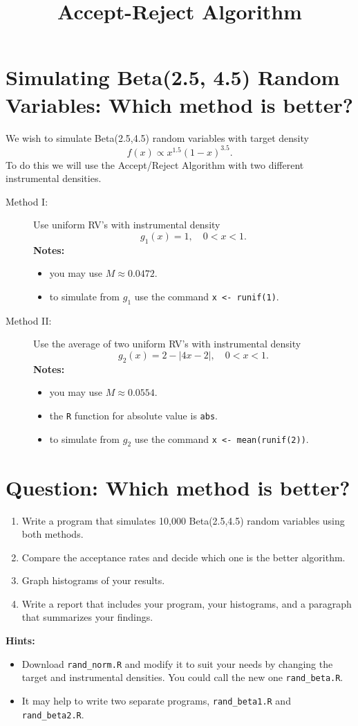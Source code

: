 \documentclass[11pt,english]{article}
\title{Accept-Reject Algorithm}
\author{}
\date{}
\begin{document}
\maketitle


\section*{Simulating Beta(2.5, 4.5) Random Variables: Which method is better?}
\label{sec-1}

\noindent
We wish to simulate Beta(2.5,4.5) random variables with target density
\[
f(x) \propto x^{1.5}(1-x)^{3.5}.
\]
To do this we will use the Accept/Reject Algorithm with two different instrumental densities.


\begin{description}
\item[Method I:] Use uniform RV’s with instrumental density
   \[
   g_{1}(x) = 1,\quad 0 < x < 1.
   \]
   \textbf{Notes:}
\begin{itemize}
\item you may use \(M \approx 0.0472\).
\item to simulate from \(g_{1}\) use the command \texttt{x <- runif(1)}.
\end{itemize}
\item[Method II:] Use the average of two uniform RV’s with instrumental density
   \[
   g_{2}(x) = 2 - |4x - 2|,\quad 0 < x <1.
   \]
   \textbf{Notes:}
\begin{itemize}
\item you may use \(M \approx 0.0554\).
\item the \texttt{R} function for absolute value is \texttt{abs}.
\item to simulate from \(g_{2}\) use the command \texttt{x <- mean(runif(2))}.
\end{itemize}
\end{description}
\section*{Question: Which method is better?}
\label{sec-2}


\begin{enumerate}
\item Write a program that simulates 10,000 Beta(2.5,4.5) random variables using both methods.
\item Compare the acceptance rates and decide which one is the better algorithm.
\item Graph histograms of your results.
\item Write a report that includes your program, your histograms, and a paragraph that summarizes your findings.
\end{enumerate}

\textbf{Hints:}

\begin{itemize}
\item Download \texttt{rand\_norm.R} and modify it to suit your needs by changing the target and instrumental densities.  You could call the new one \texttt{rand\_beta.R}.
\item It may help to write two separate programs, \texttt{rand\_beta1.R} and \texttt{rand\_beta2.R}.
\end{itemize}
\end{document}
